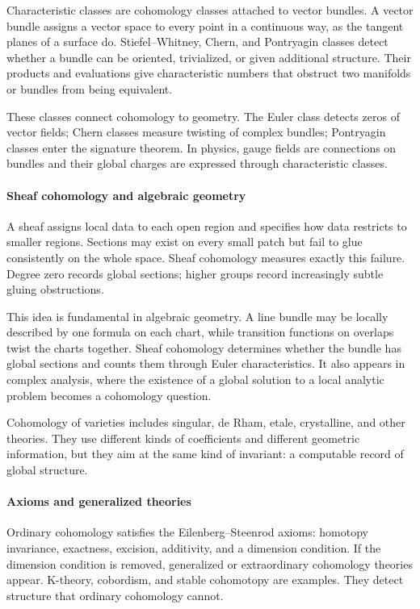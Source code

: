 Characteristic classes are cohomology classes attached to vector bundles. A vector bundle assigns a vector space to every point in a continuous way, as the tangent planes of a surface do. Stiefel--Whitney, Chern, and Pontryagin classes detect whether a bundle can be oriented, trivialized, or given additional structure. Their products and evaluations give characteristic numbers that obstruct two manifolds or bundles from being equivalent.

These classes connect cohomology to geometry. The Euler class detects zeros of vector fields; Chern classes measure twisting of complex bundles; Pontryagin classes enter the signature theorem. In physics, gauge fields are connections on bundles and their global charges are expressed through characteristic classes. \cite{cohomology_theory_ref3,cohomology_theory_ref6}

\paragraph{Sheaf cohomology and algebraic geometry}

A sheaf assigns local data to each open region and specifies how data restricts to smaller regions. Sections may exist on every small patch but fail to glue consistently on the whole space. Sheaf cohomology measures exactly this failure. Degree zero records global sections; higher groups record increasingly subtle gluing obstructions.

This idea is fundamental in algebraic geometry. A line bundle may be locally described by one formula on each chart, while transition functions on overlaps twist the charts together. Sheaf cohomology determines whether the bundle has global sections and counts them through Euler characteristics. It also appears in complex analysis, where the existence of a global solution to a local analytic problem becomes a cohomology question.

Cohomology of varieties includes singular, de Rham, etale, crystalline, and other theories. They use different kinds of coefficients and different geometric information, but they aim at the same kind of invariant: a computable record of global structure. \cite{cohomology_theory_ref4,cohomology_theory_ref7}

\paragraph{Axioms and generalized theories}

Ordinary cohomology satisfies the Eilenberg--Steenrod axioms: homotopy invariance, exactness, excision, additivity, and a dimension condition. If the dimension condition is removed, generalized or extraordinary cohomology theories appear. K-theory, cobordism, and stable cohomotopy are examples. They detect structure that ordinary cohomology cannot.

